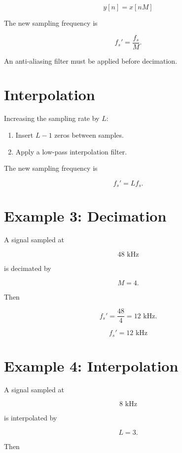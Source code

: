 \[
\boxed{
y[n]=x[nM]
}
\]

The new sampling frequency is

\[
f_s'=\frac{f_s}{M}.
\]

An anti-aliasing filter must be applied before decimation.


\section{Interpolation}

Increasing the sampling rate by \(L\):

\begin{enumerate}
\item Insert \(L-1\) zeros between samples.
\item Apply a low-pass interpolation filter.
\end{enumerate}

The new sampling frequency is

\[
f_s'=Lf_s.
\]


\section{Example 3: Decimation}

A signal sampled at

\[
48\text{ kHz}
\]

is decimated by

\[
M=4.
\]

Then

\[
f_s'=
\frac{48}{4}
=
12\text{ kHz}.
\]

\[
\boxed{
f_s'=12\text{ kHz}
}
\]


\section{Example 4: Interpolation}

A signal sampled at

\[
8\text{ kHz}
\]

is interpolated by

\[
L=3.
\]

Then

